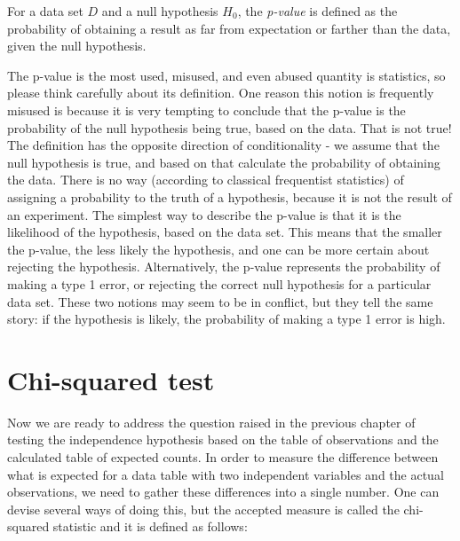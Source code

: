 \documentclass[
  letterpaper,
  DIV=11,
  numbers=noendperiod]{scrreprt}
\begin{document}
\begin{tcolorbox}[enhanced jigsaw, coltitle=black, arc=.35mm, opacitybacktitle=0.6, breakable, bottomtitle=1mm, toptitle=1mm, titlerule=0mm, colback=white, leftrule=.75mm, rightrule=.15mm, colframe=quarto-callout-note-color-frame, colbacktitle=quarto-callout-note-color!10!white, opacityback=0, title=\textcolor{quarto-callout-note-color}{\faInfo}\hspace{0.5em}{Definition}, left=2mm, toprule=.15mm, bottomrule=.15mm]

For a data set \(D\) and a null hypothesis \(H_0\), the \emph{p-value}
is defined as the probability of obtaining a result as far from
expectation or farther than the data, given the null hypothesis.

\end{tcolorbox}

The p-value is the most used, misused, and even abused quantity is
statistics, so please think carefully about its definition. One reason
this notion is frequently misused is because it is very tempting to
conclude that the p-value is the probability of the null hypothesis
being true, based on the data. That is not true! The definition has the
opposite direction of conditionality - we assume that the null
hypothesis is true, and based on that calculate the probability of
obtaining the data. There is no way (according to classical frequentist
statistics) of assigning a probability to the truth of a hypothesis,
because it is not the result of an experiment. The simplest way to
describe the p-value is that it is the likelihood of the hypothesis,
based on the data set. This means that the smaller the p-value, the less
likely the hypothesis, and one can be more certain about rejecting the
hypothesis. Alternatively, the p-value represents the probability of
making a type 1 error, or rejecting the correct null hypothesis for a
particular data set. These two notions may seem to be in conflict, but
they tell the same story: if the hypothesis is likely, the probability
of making a type 1 error is high.

\hypertarget{chi-squared-test}{%
\section{Chi-squared test}\label{chi-squared-test}}

Now we are ready to address the question raised in the previous chapter
of testing the independence hypothesis based on the table of
observations and the calculated table of expected counts. In order to
measure the difference between what is expected for a data table with
two independent variables and the actual observations, we need to gather
these differences into a single number. One can devise several ways of
doing this, but the accepted measure is called the chi-squared statistic
and it is defined as follows:
\end{document}
